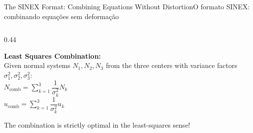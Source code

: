 \documentclass[aspectratio=169,11pt]{beamer}
\newcommand{\tr}[2]{\ifEN#2\else#1\fi}
\begin{document}
\begin{frame}{\tr{O formato SINEX: combinando equações sem deformação}{The SINEX Format: Combining Equations Without Distortion}}
\begin{columns}[onlytextwidth]
\begin{column}{0.44\textwidth}
\begin{regra}
{        \textbf{Least Squares Combination:}\\[3pt]
        Given normal systems $N_1, N_2, N_3$ from the three centers with variance factors
        $\sigma_1^2, \sigma_2^2, \sigma_3^2$:\\[4pt]
        \centering
        $N_{\text{comb}} = \sum_{k=1}^3 \dfrac{1}{\sigma_k^2} N_k$\\[4pt]
        $u_{\text{comb}} = \sum_{k=1}^3 \dfrac{1}{\sigma_k^2} u_k$\\[4pt]
        \raggedright
        The combination is strictly optimal in the least-squares sense!}
      \end{regra}
    \end{column}
  \end{columns}
\end{frame}
\end{document}
